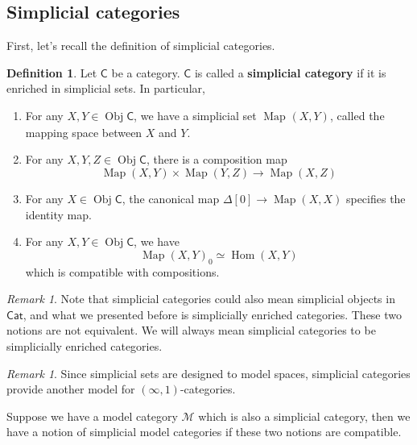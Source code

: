 \documentclass[11pt]{amsart}
\numberwithin{equation}{section}
\theoremstyle{definition}
\newtheorem{defn}[thm]{Definition}
\theoremstyle{remark}
\newtheorem{rem}[thm]{Remark}
\numberwithin{equation}{section}
\newcommand{\CM}{{\mathcal M}}
\newcommand{\CC}{{\mathsf C}}
\newcommand{\ob}{\operatorname{Obj}}
\newcommand{\cat}{\mathsf{Cat}}
\newcommand{\Hom}{\operatorname{Hom}}
\newcommand{\map}{\operatorname{Map}}
\begin{document}
\subsection{Simplicial categories}

First, let's recall the definition of simplicial categories.

\begin{defn}
	Let $\CC$ be a category. $\CC$ is called a {\bf simplicial category} if it is enriched in simplicial sets. In particular, 
	\begin{enumerate}
		\item For any $X,Y\in \ob \CC$, we have a simplicial set $\map_{}(X,Y)$, called the mapping space between $X$ and $Y$.
		\item For any $X, Y, Z \in \ob \CC$, there is a composition map
		\begin{equation*}
		\map(X,Y) \times \map (Y,Z) \to \map (X,Z)
		\end{equation*}
		\item For any $X\in \ob \CC$, the canonical map $\Delta[0] \to \map(X,X)$ specifies the identity map.
		\item  For any $X,Y\in \ob \CC$, we have
		\begin{equation*}
		 \map(X,Y)_0 \simeq \Hom(X,Y)
		\end{equation*}
		which is compatible with compositions.
	\end{enumerate}
\end{defn}

\begin{rem}
	Note that simplicial categories could also mean simplicial objects in $\cat$, and what we presented before is simplicially enriched categories. These two notions are not equivalent. We will always mean simplicial categories to be simplicially enriched categories.
\end{rem}
\begin{rem}
	Since simplicial sets are designed to model spaces, simplicial categories provide another model for $(\infty,1)$-categories.
\end{rem}

Suppose we have a model category $\CM$ which is also a simplicial category, then we have a notion of simplicial model categories if these two notions are compatible.
\end{document}
